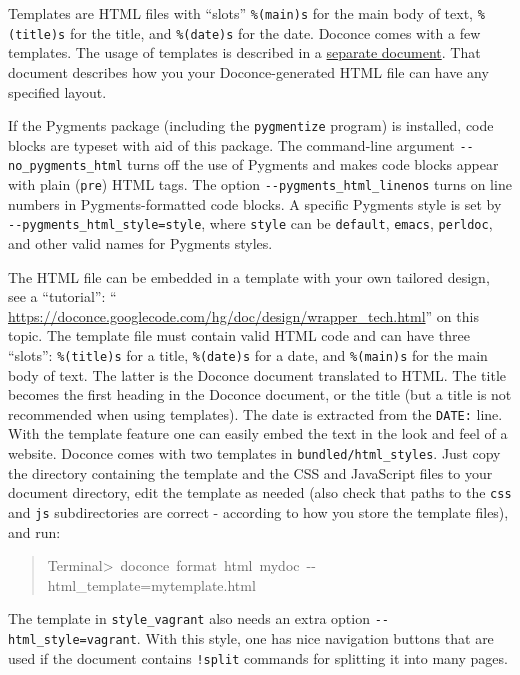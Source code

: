 \documentclass[a4paper]{article}
\begin{document}
Templates are HTML files with ``slots'' \texttt{\%(main)s} for the main body
of text, \texttt{\%(title)s} for the title, and \texttt{\%(date)s} for the date.
Doconce comes with a few templates. The usage of templates is
described in a \href{https://doconce.googlecode.com/hg/doc/design/wrapper_tech.html}{separate document}. That document describes how you your Doconce-generated
HTML file can have any specified layout.

If the Pygments package (including the \texttt{pygmentize} program)
is installed, code blocks are typeset with
aid of this package. The command-line argument \texttt{-{}-no\_pygments\_html}
turns off the use of Pygments and makes code blocks appear with
plain (\texttt{pre}) HTML tags. The option \texttt{-{}-pygments\_html\_linenos} turns
on line numbers in Pygments-formatted code blocks. A specific
Pygments style is set by \texttt{-{}-pygments\_html\_style=style}, where \texttt{style}
can be \texttt{default}, \texttt{emacs}, \texttt{perldoc}, and other valid names for
Pygments styles.

The HTML file can be embedded in a template with your own tailored
design, see a ``tutorial'': `` \url{https://doconce.googlecode.com/hg/doc/design/wrapper_tech.html}'' on this topic. The template file must contain
valid HTML code and can have three ``slots'': \texttt{\%(title)s} for a title,
\texttt{\%(date)s} for a date, and \texttt{\%(main)s} for the main body of text. The
latter is the
Doconce document translated to HTML. The title becomes the first
heading in the Doconce document, or the title (but a title is not
recommended when using templates). The date is extracted from the
\texttt{DATE:} line. With the template feature one can easily embed
the text in the look and feel of a website. Doconce comes with
two templates in \texttt{bundled/html\_styles}. Just copy the directory
containing the template and the CSS and JavaScript files to your
document directory, edit the template as needed (also check that
paths to the \texttt{css} and \texttt{js} subdirectories are correct - according
to how you store the template files), and run:
%
\begin{quote}{\ttfamily \raggedright \noindent
Terminal>~doconce~format~html~mydoc~-{}-html\_template=mytemplate.html
}
\end{quote}

The template in \texttt{style\_vagrant} also needs an extra option
\texttt{-{}-html\_style=vagrant}. With this style, one has nice navigation buttons
that are used if the document contains \texttt{!split} commands for splitting
it into many pages.
\end{document}
